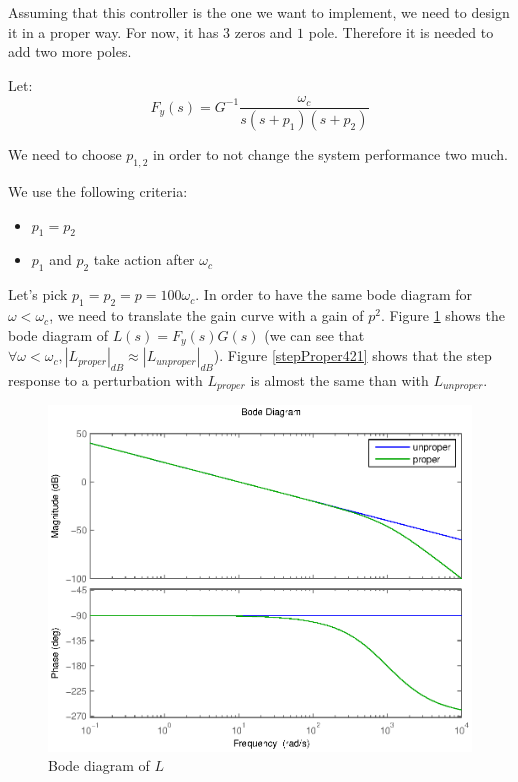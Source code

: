 Assuming that this controller is the one we want to implement, we need to design it in a proper way. For now, it has $3$ zeros and $1$ pole. Therefore it is needed to add two more poles.

Let:
$$F_y(s) = G^{-1}\frac{\omega_c}{s(s+p_1)(s+p_2)}$$

We need to choose $p_{1,2}$ in order to not change the system performance two much.

We use the following criteria:

\begin{itemize}
    \item $p_1 = p_2$
    \item $p_1$ and $p_2$ take action after $\omega_c$ 
\end{itemize}

Let's pick $p_1 = p_2 = p = 100\omega_c$. In order to have the same bode diagram for $\omega < \omega_c$, we need to translate the gain curve with a gain of $p^2$. Figure \ref{bodeProper421} shows the bode diagram of $L(s) = F_y(s) G(s)$ (we can see that $\forall \omega < \omega_c, |L_{proper}|_{dB} \approx |L_{unproper}|_{dB}$). Figure \ref{stepProper421} shows that the step response to a perturbation with $L_{proper}$ is almost the same than with $L_{unproper}$.

\begin{figure}[h!b]
    \includegraphics[width=\columnwidth]{fig/bodeProper421.eps}
    \caption{Bode diagram of $L$} 
    \label{bodeProper421}
\end{figure}


